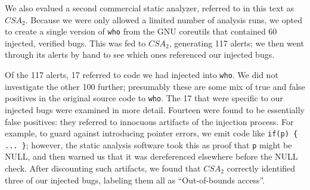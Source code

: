 We also evalued a second commercial static analyzer, referred to in this text as $CSA_2$. Because we were only allowed a limited number of analysis runs, we opted to create a single version of \verb+who+ from the GNU coreutils that contained 60 injected, verified bugs. This was fed to $CSA_2$, generating 117 alerts; we then went through its alerts by hand to see which ones referenced our injected bugs.

Of the 117 alerts, 17 referred to code we had injected into \verb+who+. We did not investigate the other 100 further; presumably these are some mix of true and false positives in the original source code to \verb+who+. The 17 that were specific to our injected bugs were examined in more detail. Fourteen were found to be essentially false positives: they referred to innocuous artifacts of the injection process. For example, to guard against introducing pointer errors, we emit code like \verb+if(p) { ... }+; however, the static analysis software took this as proof that \verb+p+ might be NULL, and then warned us that it was dereferenced elsewhere before the NULL check. After discounting such artifacts, we found that $CSA_2$ correctly identified three of our injected bugs, labeling them all as ``Out-of-bounds access''.

